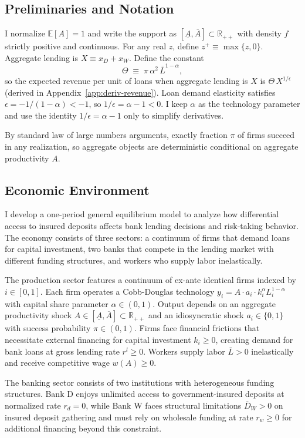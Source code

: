 \documentclass[12pt]{article}
\begin{document}
\subsection{Preliminaries and Notation}
\label{sec:prelim}
I normalize $\mathbb{E}[A]=1$ and write the support as $[\underline A,\overline A]\subset\mathbb{R}_{++}$ with density $f$ strictly positive and continuous. For any real $z$, define $z^+\equiv\max\{z,0\}$. Aggregate lending is $X\equiv x_D+x_W$. Define the constant
\[
\Theta\;\equiv\; \pi\,\alpha^{2}\,\overline{L}^{1-\alpha},
\]
so the expected revenue per unit of loans when aggregate lending is $X$ is $\Theta\,X^{1/\epsilon}$ (derived in Appendix~\ref{app:deriv-revenue}). Loan demand elasticity satisfies $\epsilon=-1/(1-\alpha)<-1$, so $1/\epsilon=\alpha-1<0$. I keep $\alpha$ as the technology parameter and use the identity $1/\epsilon=\alpha-1$ only to simplify derivatives.

By standard law of large numbers arguments, exactly fraction $\pi$ of firms succeed in any realization, so aggregate objects are deterministic conditional on aggregate productivity $A$.

\subsection{Economic Environment}
I develop a one-period general equilibrium model to analyze how differential access to insured deposits affects bank lending decisions and risk-taking behavior. The economy consists of three sectors: a continuum of firms that demand loans for capital investment, two banks that compete in the lending market with different funding structures, and workers who supply labor inelastically. 

The production sector features a continuum of ex-ante identical firms indexed by $i \in [0,1]$. Each firm operates a Cobb-Douglas technology $y_{i}=A \cdot a_{i} \cdot k_{i}^{\alpha}L_{i}^{1-\alpha}$ with capital share parameter $\alpha \in (0,1)$. Output depends on an aggregate productivity shock $A \in [\underline{A}, \overline{A}] \subset \mathbb{R}_{++}$ and an idiosyncratic shock $a_i \in \{0,1\}$ with success probability $\pi \in (0,1)$. Firms face financial frictions that necessitate external financing for capital investment $k_i \geq 0$, creating demand for bank loans at gross lending rate $r^l \geq 0$. Workers supply labor $\overline{L} > 0$ inelastically and receive competitive wage $w(A) \geq 0$.

The banking sector consists of two institutions with heterogeneous funding structures. Bank D enjoys unlimited access to government-insured deposits at normalized rate $r_d = 0$, while Bank W faces structural limitations $\overline{D}_W > 0$ on insured deposit gathering and must rely on wholesale funding at rate $r_w \geq 0$ for additional financing beyond this constraint. 
\end{document}
